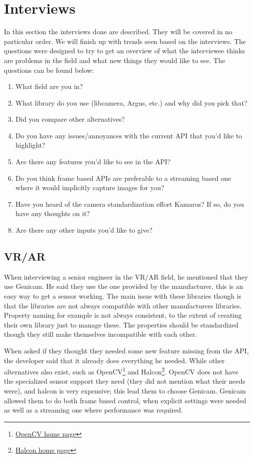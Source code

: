 \chapter{Interviews}
In this section the interviews done are described. They will be covered in no
particular order. We will finish up with trends seen based on the interviews.
The questions were designed to try to get an overview of what the interviewee
thinks are problems in the field and what new things they would like to see.
The questions can be found below:

\begin{enumerate}
    \item What field are you in?
    \item What library do you use (libcamera, Argus, etc.) and why did you pick that?
    \item Did you compare other alternatives?
    \item Do you have any issues/annoyances with the current API that you'd like to highlight?
    \item Are there any features you'd like to see in the API?
    \item Do you think frame based APIs are preferable to a streaming based one where it would implicitly capture images for you?
    \item Have you heard of the camera standardization effort Kamaros? If so, do you have any thoughts on it?
    \item Are there any other inputs you'd like to give?
\end{enumerate}

\section{VR/AR}\label{section:interview:vrar}
When interviewing a senior engineer in the VR/AR field, he mentioned that
they use Genicam. He said they use the one provided by the manufacturer, this
is an easy way to get a sensor working. The main issue with these libraries
though is that the libraries are not always compatible with other manufacturers
libraries. Property naming for example is not always consistent, to the extent
of creating their own library just to manage these. The properties should be
standardized though they still make themselves incompatible with each other.

When asked if they thought they needed some new feature missing from the API,
the developer said that it already does everything he needed. While other
alternatives also exist, such as OpenCV\footnote{\href{https://opencv.org/}{OpenCV home page}}
and Halcon\footnote{\href{https://www.mvtec.com/products/halcon}{Halcon home page}}.
OpenCV does not have the specialized sensor support they need (they did not
mention what their needs were), and halcon is very expensive; this lead them to
choose Genicam. Genicam allowed them to do both frame based control, when
explicit settings were needed as well as a streaming one where performance was
required.

